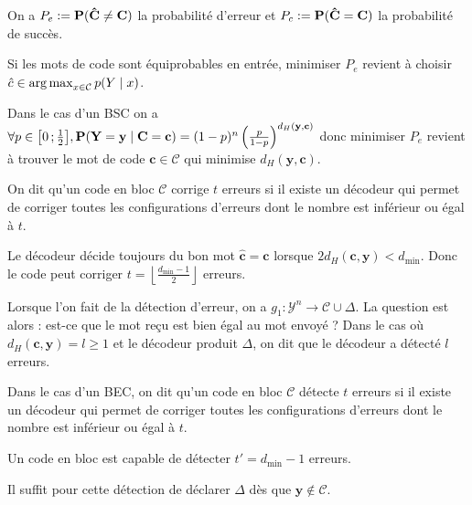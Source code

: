 	On a $P_e := \mathbf{P}(\mathbf{\hat{C}} \neq \mathbf{C})$ la probabilité d'erreur et $P_c := \mathbf{P}(\mathbf{\hat{C}} = \mathbf{C})$ la probabilité de succès.

	\begin{pop}
		Si les mots de code sont équiprobables en entrée, minimiser $P_e$ revient à choisir $\hat{c} \in \operatorname{arg\, max}_{x \in \mathcal{C}} p(Y \mid x)$.
	\end{pop}

	\begin{pop}
		Dans le cas d'un BSC on a
		$\forall p \in \mathopen{}\mathclose{\left[0\mathclose{}\mathpunct{};\frac{1}{2}\right]}, \mathbf{P}(\mathbf{Y} = \mathbf{y} \mid \mathbf{C} = \mathbf{c}) = (1 - p)^n \left( \frac{p}{1 - p} \right)^{d_H(\mathbf{y},\mathbf{c})}$
		donc minimiser $P_e$ revient à trouver le mot de code $\mathbf{c} \in \mathcal{C}$ qui minimise $d_H(\mathbf{y},\mathbf{c})$.
	\end{pop}

	\begin{voc}
		On dit qu'un code en bloc $\mathcal{C}$ corrige $t$ erreurs si il existe un décodeur qui permet de corriger toutes les configurations d'erreurs dont le nombre est inférieur ou égal à $t$.
	\end{voc}

	\begin{pop}
		Le décodeur décide toujours du bon mot $\mathbf{\hat{c}} = \mathbf{c}$ lorsque $2 d_H(\mathbf{c},\mathbf{y}) < d_{\min}$.
		Donc le code peut corriger $t = \left\lfloor \frac{d_{\min} - 1}{2} \right\rfloor$ erreurs.
	\end{pop}

	Lorsque l'on fait de la détection d'erreur, on a $g_1 \colon \mathcal{Y}^n \to \mathcal{C} \cup \Delta$.
	La question est alors : est-ce que le mot reçu est bien égal au mot envoyé ?
	Dans le cas où $d_H(\mathbf{c},\mathbf{y}) = l \geq 1$ et le décodeur produit $\Delta$, on dit que le décodeur a détecté $l$ erreurs.

	\begin{voc}
		Dans le cas d'un BEC, on dit qu'un code en bloc $\mathcal{C}$ détecte $t$ erreurs si il existe un décodeur qui permet de corriger toutes les configurations d'erreurs dont le nombre est inférieur ou égal à $t$.
	\end{voc}

	\begin{pop}
		Un code en bloc est capable de détecter $t' = d_{\min} - 1$ erreurs.
	\end{pop}
	Il suffit pour cette détection de déclarer $\Delta$ dès que $\mathbf{y} \not\in \mathcal{C}$.